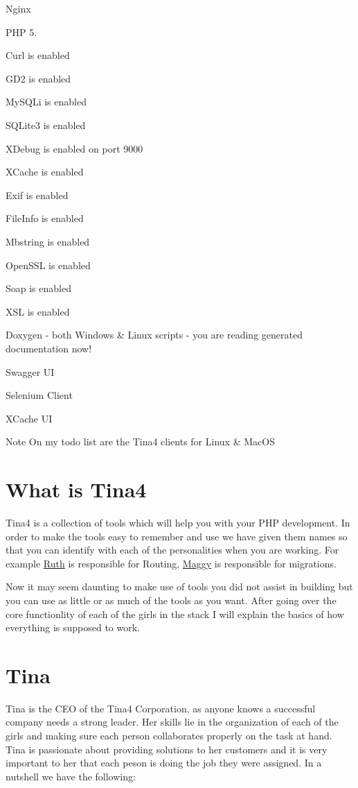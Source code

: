 \begin{DoxyItemize}
\item Nginx 
\item P\+H\+P 5. 
\begin{DoxyEnumerate}
\item Curl is enabled 
\item G\+D2 is enabled 
\item My\+S\+Q\+Li is enabled 
\item S\+Q\+Lite3 is enabled 
\item X\+Debug is enabled on port 9000 
\item X\+Cache is enabled 
\item Exif is enabled 
\item File\+Info is enabled 
\item Mbstring is enabled 
\item Open\+S\+S\+L is enabled 
\item Soap is enabled 
\item X\+S\+L is enabled 
\end{DoxyEnumerate}
\item Doxygen -\/ both Windows \& Linux scripts -\/ you are reading generated documentation now! 
\item Swagger U\+I 
\item Selenium Client 
\item X\+Cache U\+I 
\end{DoxyItemize}

\begin{DoxyNote}{Note}
On my todo list are the Tina4 clients for Linux \& Mac\+O\+S
\end{DoxyNote}
\hypertarget{index_what_is_tina4}{}\section{What is Tina4}\label{index_what_is_tina4}
Tina4 is a collection of tools which will help you with your P\+H\+P development. In order to make the tools easy to remember and use we have given them names so that you can identify with each of the personalities when you are working. For example \hyperlink{classRuth}{Ruth} is responsible for Routing, \hyperlink{classMaggy}{Maggy} is responsible for migrations.

Now it may seem daunting to make use of tools you did not assist in building but you can use as little or as much of the tools as you want. After going over the core functionlity of each of the girls in the stack I will explain the basics of how everything is supposed to work.\hypertarget{index_tina}{}\section{Tina}\label{index_tina}
Tina is the C\+E\+O of the Tina4 Corporation, as anyone knows a successful company needs a strong leader. Her skills lie in the organization of each of the girls and making sure each person collaborates properly on the task at hand. Tina is passionate about providing solutions to her customers and it is very important to her that each peson is doing the job they were assigned. In a nutshell we have the following\+:


